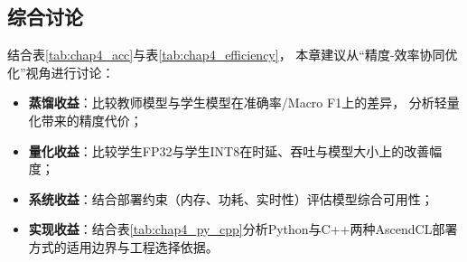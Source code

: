 

\subsection{综合讨论}

结合表\ref{tab:chap4_acc}与表\ref{tab:chap4_efficiency}，
本章建议从“精度-效率协同优化”视角进行讨论：
\begin{itemize}[nosep,leftmargin=*]
	\item \textbf{蒸馏收益}：比较教师模型与学生模型在准确率/Macro F1上的差异，
	分析轻量化带来的精度代价；
	\item \textbf{量化收益}：比较学生FP32与学生INT8在时延、吞吐与模型大小上的改善幅度；
	\item \textbf{系统收益}：结合部署约束（内存、功耗、实时性）评估模型综合可用性；
	\item \textbf{实现收益}：结合表\ref{tab:chap4_py_cpp}分析Python与C++两种AscendCL部署方式的适用边界与工程选择依据。
\end{itemize}

